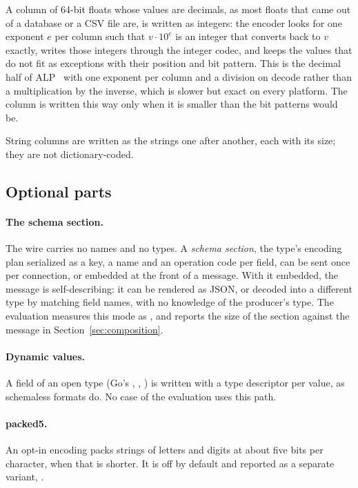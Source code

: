 A column of 64-bit floats whose values are decimals, as most floats that
came out of a database or a CSV file are, is written as integers: the encoder
looks for one exponent $e$ per column such that $v \cdot 10^e$ is an integer
that converts back to $v$ exactly, writes those integers through the integer
codec, and keeps the values that do not fit as exceptions with their position
and bit pattern. This is the decimal half of ALP~\cite{afroozeh2023alp} with
one exponent per column and a division on decode rather than a multiplication
by the inverse, which is slower but exact on every platform. The column is
written this way only when it is smaller than the bit patterns would be.

String columns are written as the strings one after another, each with its
size; they are not dictionary-coded.

\subsection{Optional parts}

\paragraph{The schema section.} The wire carries no names and no types. A
\emph{schema section}, the type's encoding plan serialized as a key, a name
and an operation code per field, can be sent once per connection, or embedded
at the front of a message. With it embedded, the message is self-describing:
it can be rendered as JSON, or decoded into a different type by matching
field names, with no knowledge of the producer's type. The evaluation
measures this mode as , and reports the size of the section
against the message in Section~\ref{sec:composition}.

\paragraph{Dynamic values.} A field of an open type (Go's ,
, ) is written with a type descriptor per
value, as schemaless formats do. No case of the evaluation uses this path.

\paragraph{packed5.} An opt-in encoding packs strings of letters and digits
at about five bits per character, when that is shorter. It is off by default
and reported as a separate variant, .

